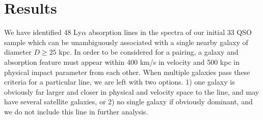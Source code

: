 \documentclass[iop]{emulateapj-rtx4}
\begin{document}


\section{Results}

We have identified 48 Ly$\alpha$ absorption lines in the spectra of our initial 33 QSO sample which can be unambiguously associated with a single nearby galaxy of diameter $D\geq25$ kpc. In order to be considered for a pairing, a galaxy and absorption feature must appear within 400 km/s in velocity and 500 kpc in physical impact parameter from each other. When multiple galaxies pass these criteria for a particular line, we are left with two options. 1) one galaxy is obviously far larger and closer in physical and velocity space to the line, and may have several satellite galaxies, or 2) no single galaxy if obviously dominant, and we do not include this line in further analysis. 
\end{document}
